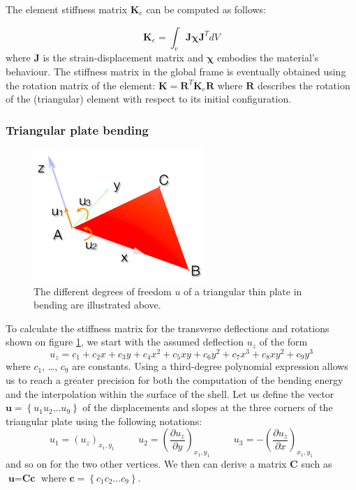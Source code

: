 \documentclass{llncs}
\begin{document}
The element stiffness matrix $\textbf{K}_e$ can be computed as follows:

\begin{equation}
\textbf{K}_e = \int_v \textbf{J} \boldsymbol{\chi} \textbf{J}^{T} dV
\end{equation}
where $\textbf{J}$ is the strain-displacement matrix and $\boldsymbol\chi$ embodies the material's behaviour. The stiffness matrix in the global frame is eventually obtained using the rotation matrix of the element: $\textbf{K} = \textbf{R}^{T} \textbf{K}_e \textbf{R} $ where $\textbf{R}$ describes the rotation of the (triangular) element with respect to its initial configuration.

\subsubsection{Triangular plate bending}

\begin{figure}
\centering
\includegraphics[height=5cm]{images/bending}
\caption {The different degrees of freedom $u$ of a triangular thin plate in bending are illustrated above.}
\label{fig-triangle}
\end{figure}

To calculate the stiffness matrix for the transverse deflections and rotations shown on figure \ref{fig-triangle}, we start with the assumed deflection $u_z$ of the form
\begin{equation}
 u_z = c_1 + c_2x + c_3y + c_4x^2 + c_5xy + c_6y^2 + c_7x^3 + c_8xy^2 + c_9y^3
\label{eq-deflection}
\end{equation} 
where $c_1$, \ldots , $c_9$ are constants. Using a third-degree polynomial expression allows us to reach a greater precision for both the computation of the bending energy and the interpolation within the surface of the shell. Let us define the vector $\textbf{u} = \left\{u_1 u_2 \ldots u_9 \right\} $ of the displacements and slopes at the three corners of the triangular plate using the following notations:
\begin{equation}
u_1 = (u_z)_{x_1,y_1} \hspace{1cm} u_2 = \left(\frac{\partial u_z}{\partial y}\right)_{x_1,y_1} \hspace{1cm} u_3 = - \left(\frac{\partial u_z}{\partial x}\right)_{x_1,y_1}
\end{equation} 
and so on for the two other vertices.
We then can derive a matrix $\textbf{C}$ such as $\textbf{u} = \textbf{Cc}$ where $\textbf{c} = \left\{c_1 c_2 \ldots c_9 \right\} $.
\end{document}
